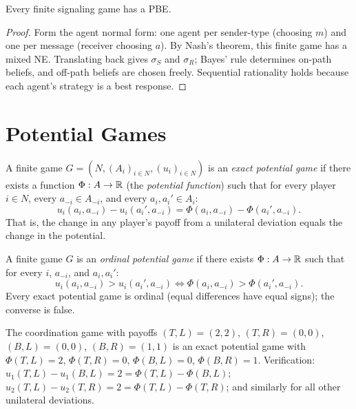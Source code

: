 \documentclass[11pt,a4paper]{article}
\begin{document}
\begin{proposition}
\label{prop:pbe-existence}
Every finite signaling game has a PBE.
\end{proposition}

\begin{proof}
Form the agent normal form: one agent per sender-type (choosing $m$) and
one per message (receiver choosing $a$). By Nash's theorem, this finite
game has a mixed NE. Translating back gives $\sigma_S$ and $\sigma_R$;
Bayes' rule determines on-path beliefs, and off-path beliefs are chosen
freely. Sequential rationality holds because each agent's strategy is a
best response.
\end{proof}


\section{Potential Games}
\label{sec:potential-games}

\begin{definition}
\label{def:exact-potential}
A finite game $G = (N, (A_i)_{i \in N}, (u_i)_{i \in N})$ is an
\emph{exact potential game} if there exists a function
$\Phi : A \to \mathbb{R}$ (the \emph{potential function}) such that for every
player $i \in N$, every $a_{-i} \in A_{-i}$, and every
$a_i, a_i' \in A_i$:
\[
    u_i(a_i, a_{-i}) - u_i(a_i', a_{-i})
    = \Phi(a_i, a_{-i}) - \Phi(a_i', a_{-i}).
\]
That is, the change in any player's payoff from a unilateral deviation
equals the change in the potential.
\end{definition}

\begin{definition}
\label{def:ordinal-potential}
A finite game $G$ is an \emph{ordinal potential game} if there exists
$\Phi : A \to \mathbb{R}$ such that for every $i$, $a_{-i}$, and $a_i, a_i'$:
\[
    u_i(a_i, a_{-i}) > u_i(a_i', a_{-i})
    \iff \Phi(a_i, a_{-i}) > \Phi(a_i', a_{-i}).
\]
Every exact potential game is ordinal (equal differences have equal
signs); the converse is false.
\end{definition}

\begin{example}
\label{ex:coordination}
The coordination game with payoffs $(T,L) = (2,2)$, $(T,R) = (0,0)$,
$(B,L) = (0,0)$, $(B,R) = (1,1)$ is an exact potential game with
$\Phi(T,L) = 2$, $\Phi(T,R) = 0$, $\Phi(B,L) = 0$, $\Phi(B,R) = 1$.
Verification: $u_1(T,L) - u_1(B,L) = 2 = \Phi(T,L) - \Phi(B,L)$;
$u_2(T,L) - u_2(T,R) = 2 = \Phi(T,L) - \Phi(T,R)$; and similarly for
all other unilateral deviations.
\end{example}
\end{document}
